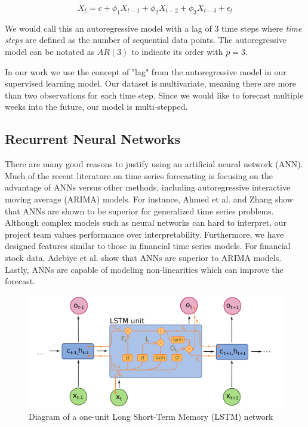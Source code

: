 \documentclass[11pt, oneside]{article}
\begin{document}
\begin{equation}
X_t = c + \phi_1 X_{t-1} + \phi_2 X_{t-2} + \phi_3 X_{t-3} + \epsilon_t
\end{equation}

We would call this an autoregressive model with a lag of 3 time steps where \textit{time steps} are defined as the number of sequential data points. The autoregressive model can be notated as $AR(3)$ to indicate its order with $p=3$.

In our work we use the concept of "lag" from the autoregressive model in our supervised learning model. Our dataset is multivariate, meaning there are more than two observations for each time step. Since we would like to forecast multiple weeks into the future, our model is multi-stepped.

\subsection{Recurrent Neural Networks}

There are many good reasons to justify using an artificial neural network (ANN). Much of the recent literature on time series forecasting is focusing on the advantage of ANNs versus other methods, including autoregressive interactive moving average (ARIMA) models. For instance, Ahmed et al. and Zhang show that ANNs are shown to be superior for generalized time series problems. Although complex models such as neural networks can hard to interpret, our project team values performance over interpretability. Furthermore, we have designed features similar to those in financial time series models. For financial stock data, Adebiye et al. show that ANNs are superior to ARIMA models. Lastly, ANNs are capable of modeling non-linearities which can improve the forecast.

\begin{figure}[h]
  \caption{Diagram of a one-unit Long Short-Term Memory (LSTM) network}
  \centering
  \includegraphics[width=12.5cm]{images/Long_Short-Term_Memory.png}
\end{figure}
\end{document}
